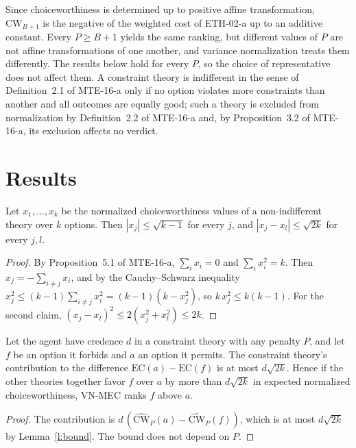 \documentclass{situationist-preprint}
\begin{document}
Since choiceworthiness is determined up to positive affine transformation, $\mathrm{CW}_{B+1}$ is the negative of the weighted cost of ETH-02-a up to an additive constant. Every $P\ge B+1$ yields the same ranking, but different values of $P$ are not affine transformations of one another, and variance normalization treats them differently. The results below hold for every $P$, so the choice of representative does not affect them. A constraint theory is indifferent in the sense of Definition~2.1 of MTE-16-a only if no option violates more constraints than another and all outcomes are equally good; such a theory is excluded from normalization by Definition~2.2 of MTE-16-a and, by Proposition~3.2 of MTE-16-a, its exclusion affects no verdict.

\section{Results}

\begin{lemma}\label{l:bound}
Let $x_1,\dots,x_k$ be the normalized choiceworthiness values of a non-indifferent theory over $k$ options. Then $|x_j|\le\sqrt{k-1}$ for every $j$, and $|x_j - x_l|\le\sqrt{2k}$ for every $j,l$.
\end{lemma}

\begin{proof}
By Proposition~5.1 of MTE-16-a, $\sum_i x_i = 0$ and $\sum_i x_i^2 = k$. Then $x_j = -\sum_{i\neq j} x_i$, and by the Cauchy--Schwarz inequality $x_j^2 \le (k-1)\sum_{i\neq j}x_i^2 = (k-1)(k-x_j^2)$, so $k\,x_j^2\le k(k-1)$. For the second claim, $(x_j-x_l)^2\le 2(x_j^2+x_l^2)\le 2k$.
\end{proof}

\begin{proposition}[No veto]\label{p:noveto}
Let the agent have credence $d$ in a constraint theory with any penalty $P$, and let $f$ be an option it forbids and $a$ an option it permits. The constraint theory's contribution to the difference $\mathrm{EC}(a)-\mathrm{EC}(f)$ is at most $d\sqrt{2k}$. Hence if the other theories together favor $f$ over $a$ by more than $d\sqrt{2k}$ in expected normalized choiceworthiness, VN-MEC ranks $f$ above $a$.
\end{proposition}

\begin{proof}
The contribution is $d\,(\widehat{\mathrm{CW}}_P(a)-\widehat{\mathrm{CW}}_P(f))$, which is at most $d\sqrt{2k}$ by Lemma~\ref{l:bound}. The bound does not depend on $P$.
\end{proof}
\end{document}
